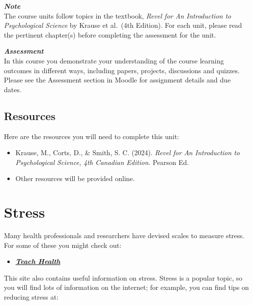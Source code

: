 \documentclass[
]{book}
\providecommand{\tightlist}{%
  \setlength{\itemsep}{0pt}\setlength{\parskip}{0pt}}
\begin{document}
\begin{caution}
\textbf{\emph{Note}}\\
The course units follow topics in the textbook, \emph{Revel for An Introduction to Psychological Science} by Krause et al.~(4th Edition). For each unit, please read the pertinent chapter(s) before completing the assessment for the unit.
\end{caution}

\begin{assessment}
\textbf{\emph{Assessment}}\\
In this course you demonstrate your understanding of the course learning outcomes in different ways, including papers, projects, discussions and quizzes. Please see the Assessment section in Moodle for assignment details and due dates.
\end{assessment}

\hypertarget{resources-8}{%
\subsection*{Resources}\label{resources-8}}

Here are the resources you will need to complete this unit:

\begin{itemize}
\tightlist
\item
  Krause, M., Corts, D., \& Smith, S. C. (2024). \emph{Revel for An Introduction to Psychological Science, 4th Canadian Edition.} Pearson Ed.
\item
  Other resources will be provided online.
\end{itemize}

\hypertarget{stress}{%
\section{Stress}\label{stress}}

Many health professionals and researchers have devised scales to measure stress. For some of these you might check out:

\begin{itemize}
\tightlist
\item
  \href{http://www.teachhealth.com/\#stressscale}{\textbf{\emph{Teach Health}}}
\end{itemize}

This site also contains useful information on stress. Stress is a popular topic, so you will find lots of information on the internet; for example, you can find tips on reducing stress at:
\end{document}
